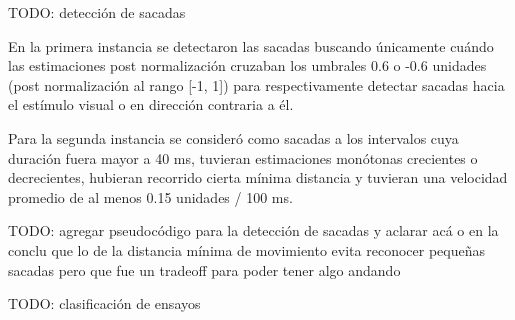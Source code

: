   TODO: detección de sacadas

  En la primera instancia se detectaron las sacadas buscando únicamente cuándo
  las estimaciones post normalización cruzaban los umbrales 0.6 o -0.6 unidades
  (post normalización al rango [-1, 1]) para respectivamente detectar sacadas
  hacia el estímulo visual o en dirección contraria a él.

  Para la segunda instancia se consideró como sacadas a los intervalos cuya
  duración fuera mayor a 40 ms, tuvieran estimaciones monótonas crecientes o
  decrecientes, hubieran recorrido cierta mínima distancia y tuvieran una
  velocidad promedio de al menos 0.15 unidades / 100 ms.

  TODO: agregar pseudocódigo para la detección de sacadas y aclarar acá o en la
        conclu que lo de la distancia mínima de movimiento evita reconocer
        pequeñas sacadas pero que fue un tradeoff para poder tener algo andando


  TODO: clasificación de ensayos
